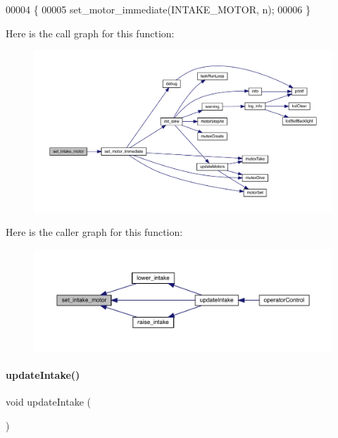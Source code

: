 \begin{DoxyCode}
00004                                     \{
00005   set_motor_immediate(INTAKE_MOTOR, n);
00006 \}
\end{DoxyCode}
Here is the call graph for this function\+:\nopagebreak
\begin{figure}[H]
\begin{center}
\leavevmode
\includegraphics[width=350pt]{mobile__goal__intake_8c_a8f215023832ba515d7b4535e3ae07498_cgraph}
\end{center}
\end{figure}
Here is the caller graph for this function\+:\nopagebreak
\begin{figure}[H]
\begin{center}
\leavevmode
\includegraphics[width=350pt]{mobile__goal__intake_8c_a8f215023832ba515d7b4535e3ae07498_icgraph}
\end{center}
\end{figure}
\mbox{\label{mobile__goal__intake_8c_ad0232c21c5c1ffda603d2b7d61034118}} 
\paragraph{update\+Intake()}
{\footnotesize\ttfamily void update\+Intake (\begin{DoxyParamCaption}{ }\end{DoxyParamCaption})}



